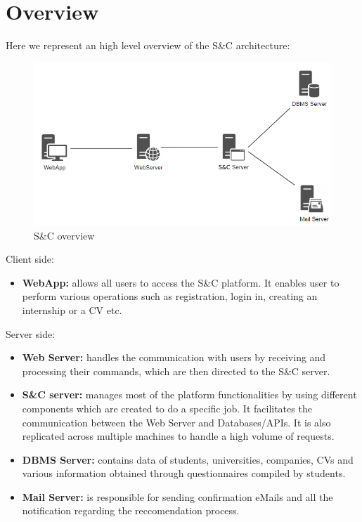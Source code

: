 \section{Overview}
Here we represent an high level overview of the S\&C architecture: 

\begin{figure}[H]
    \centering
    \includegraphics[width=\textwidth]{../images/Overview.PNG}
    \caption{S\&C overview}
    \label{fig:S\&C overview}
\end{figure}

Client side:
\begin{itemize}
\item \textbf{WebApp:} allows all users to access the S\&C platform. It enables user to perform various operations such as registration, login in, creating an internship or a CV etc.
\end{itemize}
Server side: 
\begin{itemize}
\item \textbf{Web Server:} handles the communication with users by receiving and processing their commands, which are then directed to the S\&C server. 
\item \textbf{S\&C server:} manages most of the platform functionalities by using different components which are created to do a specific job. It facilitates the communication between the Web Server and Databases/APIs. It is also replicated across multiple machines to handle a high volume of requests.
\item \textbf{DBMS Server:} contains data of students, universities, companies, CVs and various information obtained through questionnaires compiled by students. 
\item \textbf{Mail Server:} is responsible for sending confirmation eMails and all the notification regarding the reccomendation process.
\end{itemize}

